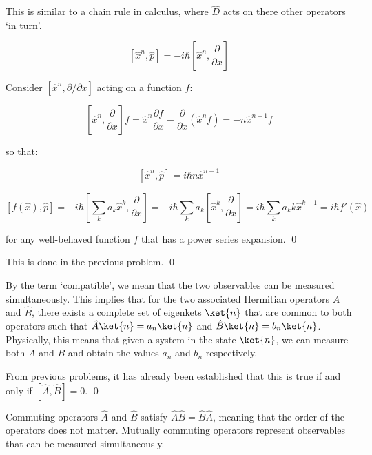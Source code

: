 \documentclass[12pt]{article}
\begin{document}
This is similar to a chain rule in calculus, where $\hat{D}$ acts on there other operators `in turn'.


\begin{equation}
    \left[ \hat{x}^{n}, \hat{p} \right] = -i\hbar \left[ \hat{x}^{n}, \frac{\partial}{\partial x} \right]
\end{equation}

Consider $[\hat{x}^{n}, \partial /\partial x]$ acting on a function $f$:

\begin{equation}
    \left[ \hat{x}^{n}, \frac{\partial}{\partial x} \right] f = \hat{x}^{n} \frac{\partial f}{\partial x} - \frac{\partial}{\partial x} \left( \hat{x}^{n} f \right) = -n \hat{x}^{n-1} f
\end{equation}

so that:

\begin{equation}
    \left[ \hat{x}^{n}, \hat{p} \right] = i\hbar n \hat{x}^{n-1}
\end{equation}


\begin{equation}
    \left[ f(\hat{x}), \hat{p} \right] = -i\hbar \left[ \sum_{k} a_{k} \hat{x}^{k}, \frac{\partial}{\partial x} \right] = -i\hbar \sum_{k} a_{k} \left[ \hat{x}^{k}, \frac{\partial}{\partial x} \right] = i\hbar \sum_{k} a_{k} k \hat{x}^{k-1} = i\hbar f'(\hat{x})
\end{equation}

for any well-behaved function $f$ that has a power series expansion.
\qed


This is done in the previous problem.
\qed


By the term `compatible', we mean that the two observables can be measured simultaneously. This implies that for the two associated Hermitian operators $\hat{A}$ and $\hat{B}$, there exists a complete set of eigenkets $\ket{n}$ that are common to both operators such that $\hat{A} \ket{n} = a_{n} \ket{n}$ and $\hat{B} \ket{n} = b_{n} \ket{n}$. Physically, this means that given a system in the state $\ket{n}$, we can measure both $A$ and $B$ and obtain the values $a_{n}$ and $b_{n}$ respectively.

From previous problems, it has already been established that this is true if and only if $[\hat{A}, \hat{B}] = 0$.
\qed


Commuting operators $\hat{A}$ and $\hat{B}$ satisfy $\hat{A} \hat{B} = \hat{B} \hat{A}$, meaning that the order of the operators does not matter. Mutually commuting operators represent observables that can be measured simultaneously.
\end{document}
